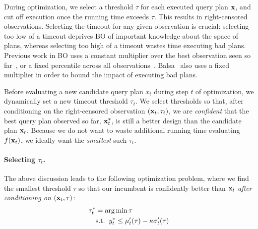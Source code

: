 During optimization, we select a threshold $\tau$ for each executed query plan $\mathbf{x}$, and cut off execution once the running time exceeds $\tau$. This results in right-censored observations. 
Selecting the timeout for any given observation is crucial: selecting too low of a timeout deprives BO of important knowledge about the space of plans, whereas selecting too high of a timeout wastes time executing bad plans. Previous work in BO uses a constant multiplier over the best observation seen so far~\cite{hutter2013_bocensored}, or a fixed percentile across all observations~\cite{eggensperger2020_censored}. Balsa~\cite{balsa} also uses a fixed multiplier  in order to bound the impact of executing bad plans. 


Before evaluating a new candidate query plan $x_t$ during step $t$ of optimization, we dynamically set a new timeout threshold $\tau_t$. 
We select thresholds so that, after conditioning on the right-censored observation $(\mathbf{x}_{t}, \tau_{t})$, we are \textit{confident} that the best query plan observed so far, $\mathbf{x}^{*}_{t}$, is still a better design than the candidate plan $\mathbf{x}_{t}$. 
Because we do not want to waste additional running time evaluating $f(\mathbf{x}_{t})$, we ideally want the \textit{smallest} such $\tau_{t}$. 

\paragraph{Selecting $\tau_{t}$.} The above discussion leads to the following optimization problem, where we find the smallest threshold $\tau$ so that our incumbent is confidently better than $\mathbf{x}_{t}$ \textit{after conditioning on $(\mathbf{x}_{t}, \tau)$}:
%
\begin{align*}
    \tau_{t}^{*} &= \operatorname*{arg\,min} \tau \\
    & \textrm{s.t.}\;\; y^{*}_{t} \leq \mu'_{t}(\tau) - \kappa \sigma'_{t}(\tau)
\end{align*}
%


